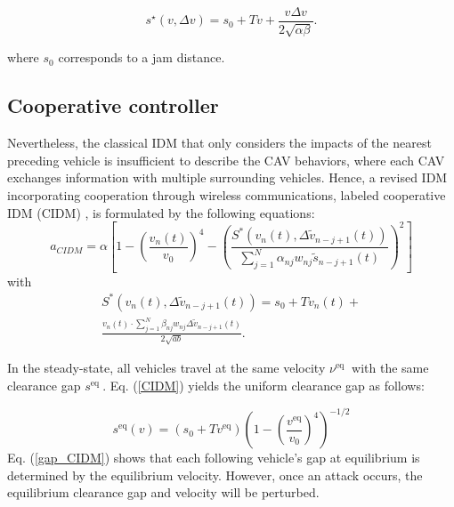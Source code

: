 \documentclass[letterpaper, 10pt, conference]{ieeeconf}  %
\def\eqref#1{(\ref{#1})}
\begin{document}
\begin{equation}
s^{\star}(v, \Delta v)=s_0+T v+\frac{v \Delta v}{2 \sqrt{\alpha \beta}}.    
\end{equation}

where $s_0$ corresponds to a jam distance. 

\subsection{Cooperative controller}
Nevertheless, the classical IDM that only considers the impacts of the nearest preceding vehicle is insufficient to describe the CAV
behaviors, where each CAV exchanges information with multiple surrounding vehicles. Hence, a revised IDM incorporating cooperation through wireless communications, labeled cooperative IDM (CIDM) \cite{C_IDM}, is formulated by the following equations:
\begin{equation}\label{CIDM}
a_{CIDM}=\alpha \left[1-\left(\frac{v_n(t)}{v_0}\right)^4-\left(\frac{S^{*}\left(v_n(t), \Delta \tilde{v}_{n-j+1}(t)\right)}{\sum_{j=1}^N \alpha_{n j} w_{n j} \tilde{{s}}_{n-j+1}(t)}\right)^2\right] 
\end{equation}
with
\begin{equation*}
\begin{aligned}
    S^{*}\left(v_n(t), \Delta \widetilde{v}_{n-j+1}(t)\right)=s_0+T v_n(t)+ \\ \frac{v_n(t) \cdot \sum_{j=1}^N \beta_{n j} w_{n j} \Delta \tilde{v}_{n-j+1}(t)}{2 \sqrt{a b}} .
\end{aligned}
\end{equation*}

In the steady-state, all vehicles travel at the same velocity $\nu^{\text {eq }}$ with the same clearance gap $s^{\text {eq }}$. Eq. \eqref{CIDM} yields the uniform clearance gap as follows:

\begin{equation}\label{gap_CIDM}    
s^{\mathrm{eq}}(v)=\left(s_0+T v^{\mathrm{eq}}\right)\left(1-\left(\frac{v^{\mathrm{eq}}}{v_0}\right)^4\right)^{-1 / 2}
\end{equation}
Eq. \eqref{gap_CIDM} shows that each following vehicle's gap at equilibrium is determined by the equilibrium velocity. However, once an
attack occurs, the equilibrium clearance gap and velocity will be perturbed.
\end{document}
